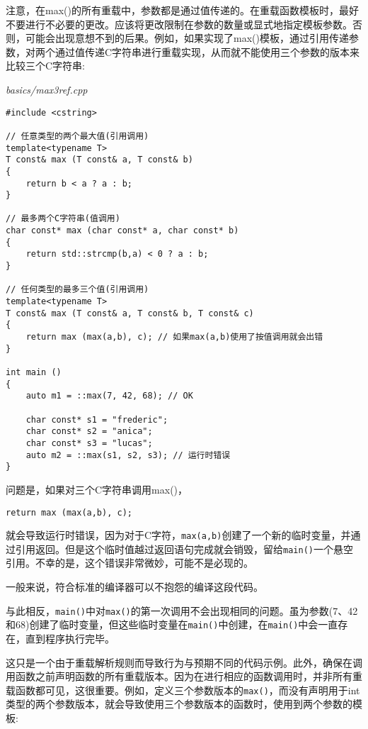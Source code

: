 注意，在max()的所有重载中，参数都是通过值传递的。在重载函数模板时，最好不要进行不必要的更改。应该将更改限制在参数的数量或显式地指定模板参数。否则，可能会出现意想不到的后果。例如，如果实现了max()模板，通过引用传递参数，对两个通过值传递C字符串进行重载实现，从而就不能使用三个参数的版本来比较三个C字符串:

\noindent
\textit{basics/max3ref.cpp}
\begin{lstlisting}[style=styleCXX]
#include <cstring>

// 任意类型的两个最大值(引用调用)
template<typename T>
T const& max (T const& a, T const& b)
{
	return b < a ? a : b;
}

// 最多两个C字符串(值调用)
char const* max (char const* a, char const* b)
{
	return std::strcmp(b,a) < 0 ? a : b;
}

// 任何类型的最多三个值(引用调用)
template<typename T>
T const& max (T const& a, T const& b, T const& c)
{
	return max (max(a,b), c); // 如果max(a,b)使用了按值调用就会出错
}

int main ()
{
	auto m1 = ::max(7, 42, 68); // OK
	
	char const* s1 = "frederic";
	char const* s2 = "anica";
	char const* s3 = "lucas";
	auto m2 = ::max(s1, s2, s3); // 运行时错误
}
\end{lstlisting}

问题是，如果对三个C字符串调用max()，

\begin{lstlisting}[style=styleCXX]
return max (max(a,b), c);
\end{lstlisting}

就会导致运行时错误，因为对于C字符，\texttt{max(a,b)}创建了一个新的临时变量，并通过引用返回。但是这个临时值越过返回语句完成就会销毁，留给\texttt{main()}一个悬空引用。不幸的是，这个错误非常微妙，可能不是必现的。

\begin{tcolorbox}[colback=webgreen!5!white,colframe=webgreen!75!black]
\hspace*{0.75cm}一般来说，符合标准的编译器可以不抱怨的编译这段代码。
\end{tcolorbox}

与此相反，\texttt{main()}中对\texttt{max()}的第一次调用不会出现相同的问题。虽为参数(7、42和68)创建了临时变量，但这些临时变量在\texttt{main()}中创建，在\texttt{main()}中会一直存在，直到程序执行完毕。

这只是一个由于重载解析规则而导致行为与预期不同的代码示例。此外，确保在调用函数之前声明函数的所有重载版本。因为在进行相应的函数调用时，并非所有重载函数都可见，这很重要。例如，定义三个参数版本的\texttt{max()}，而没有声明用于int类型的两个参数版本，就会导致使用三个参数版本的函数时，使用到两个参数的模板:

